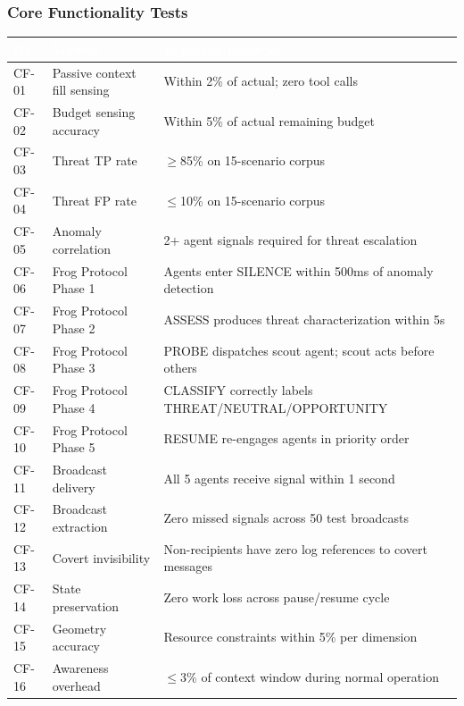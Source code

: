 \documentclass[11pt,letterpaper]{article}
\newcommand{\tableheader}[1]{\textbf{\sffamily\textcolor{white}{#1}}}
\begin{document}
\subsubsection{Core Functionality Tests}

\begin{center}
\begin{tabularx}{\textwidth}{C{1.2cm}L{3.5cm}X}
\toprule
{}
\tableheader{ID} & \tableheader{Verifies} & \tableheader{Expected Behavior} \\
\midrule
CF-01 & Passive context fill sensing & Within 2\% of actual; zero tool calls \\
CF-02 & Budget sensing accuracy & Within 5\% of actual remaining budget \\
CF-03 & Threat TP rate & $\geq$85\% on 15-scenario corpus \\
CF-04 & Threat FP rate & $\leq$10\% on 15-scenario corpus \\
CF-05 & Anomaly correlation & 2+ agent signals required for threat escalation \\
CF-06 & Frog Protocol Phase 1 & Agents enter SILENCE within 500ms of anomaly detection \\
CF-07 & Frog Protocol Phase 2 & ASSESS produces threat characterization within 5s \\
CF-08 & Frog Protocol Phase 3 & PROBE dispatches scout agent; scout acts before others \\
CF-09 & Frog Protocol Phase 4 & CLASSIFY correctly labels THREAT/NEUTRAL/OPPORTUNITY \\
CF-10 & Frog Protocol Phase 5 & RESUME re-engages agents in priority order \\
CF-11 & Broadcast delivery & All 5 agents receive signal within 1 second \\
CF-12 & Broadcast extraction & Zero missed signals across 50 test broadcasts \\
CF-13 & Covert invisibility & Non-recipients have zero log references to covert messages \\
CF-14 & State preservation & Zero work loss across pause/resume cycle \\
CF-15 & Geometry accuracy & Resource constraints within 5\% per dimension \\
CF-16 & Awareness overhead & $\leq$3\% of context window during normal operation \\
\bottomrule
\end{tabularx}
\end{center}
\end{document}
